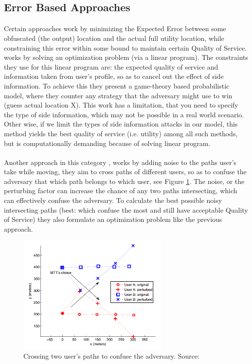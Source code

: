 \documentclass[12pt]{report}
\theoremstyle{named}
\begin{document}
\subsection{Error Based Approaches}
\paragraph{}
Certain approaches work by minimizing the Expected Error between some obfuscated (the output) location and the actual full utility location, while constraining this error within some bound to maintain certain Quality of Service. \cite{shokri2012protecting} works by solving an optimization problem (via a linear program). The constraints they use for this linear program are: the expected quality of service and information taken from user's profile, so as to cancel out the effect of side information. To achieve this they present a game-theory based probabilistic model, where they counter any strategy that the adversary might use to win (guess actual location X). This work has a limitation, that you need to specify the type of side information, which may not be possible in a real world scenario. Other wise, if we limit the types of side information attacks in our model, this method yields the best quality of service (i.e. utility) among all such methods, but is computationally demanding because of solving linear program.



\paragraph{}
Another approach in this category \cite{hoh2005protecting}, works by adding noise to the paths user's take while moving, they aim to cross paths of different users, so as to confuse the adversary that which path belongs to which user, see Figure \ref{fig:pathConfusion}. The noise, or the perturbing factor can increase the chance of any two paths intersecting, which can effectively confuse the adversary. To calculate the best possible noisy intersecting paths (best: which confuse the most and still have acceptable Quality of Service) they also formulate an optimization problem like the previous approach. 
\begin{figure}[ht]
\centering
        \includegraphics[width=75mm,scale=0.5]{Images/PathConfusion.PNG}
    \caption{Crossing two user's paths to confuse the adversary. Source:\cite{hoh2005protecting}}
    \label{fig:pathConfusion}
\end{figure}
\end{document}
